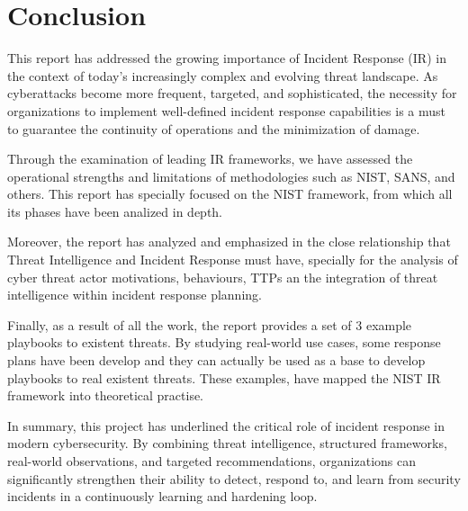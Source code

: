 \section{Conclusion}
This report has addressed the growing importance of Incident Response (IR) in the context of today’s increasingly complex and evolving threat landscape. As cyberattacks become more frequent, targeted, and sophisticated, the necessity for organizations to implement well-defined incident response capabilities is a must to guarantee the continuity of operations and the minimization of damage.

Through the examination of leading IR frameworks, we have assessed the operational strengths and limitations of methodologies such as NIST, SANS, and others. This report has specially focused on the NIST framework, from which all its phases have been analized in depth. 

Moreover, the report has analyzed and emphasized in the close relationship that Threat Intelligence and Incident Response must have, specially for the analysis of cyber threat actor motivations, behaviours, TTPs an the integration of threat intelligence within incident response planning.

Finally, as a result of all the work, the report provides a set of 3 example playbooks to existent threats. By studying real-world use cases, some response plans have been develop and they can actually be used as a base to develop playbooks to real existent threats. These examples, have mapped the NIST IR framework into theoretical practise. 

In summary, this project has underlined the critical role of incident response in modern cybersecurity. By combining threat intelligence, structured frameworks, real-world observations, and targeted recommendations, organizations can significantly strengthen their ability to detect, respond to, and learn from security incidents in a continuously learning and hardening loop.

